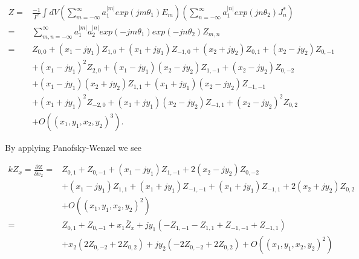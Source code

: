 \documentclass[review, number, sort&compress]{elsarticle}
\begin{document}
\begin{align}
Z = &\frac{-1}{I^{2}} \int dV \left( \displaystyle\sum\limits^{\infty}_{m=-\infty} a_{1}^{|m|} exp \left( jm\theta_{1} \right) E_{m}\right) \left( \displaystyle\sum\limits^{\infty}_{n=-\infty} a_{1}^{|n|} exp \left( jn\theta_{2} \right) J^{*}_{n}\right) \nonumber \\
   = &\displaystyle\sum\limits^{\infty}_{m,n=-\infty} a_{1}^{|m|} a_{2}^{|n|} exp\left( -jm\theta_{1} \right) exp\left( -jn\theta_{2} \right) Z_{m,n} \nonumber \\
   = &Z_{0,0} + \left( x_{1}- jy_{1} \right)Z_{1,0} + \left( x_{1} + jy_{1} \right)Z_{-1,0} + \left( x_{2} + jy_{2} \right)Z_{0,1} +  \left( x_{2} - jy_{2} \right)Z_{0,-1} \nonumber \\
      & +\left( x_{1} - jy_{1} \right)^{2}Z_{2,0} +  \left( x_{1} - jy_{1} \right)\left( x_{2} - jy_{2} \right)Z_{1,-1} + \left( x_{2} - jy_{2} \right) Z_{0,-2} \nonumber \\
      & +\left( x_{1} - jy_{1} \right)\left( x_{2} + jy_{2} \right)Z_{1,1} + \left( x_{1} + jy_{1} \right) \left( x_{2} - jy_{2} \right) Z_{-1,-1} \nonumber \\
      & +\left( x_{1} + jy_{1} \right)^{2}Z_{-2,0} + \left( x_{1} + jy_{1} \right)\left( x_{2} - jy_{2} \right) Z_{-1,1} + \left( x_{2} - jy_{2} \right)^{2}Z_{0,2} \nonumber \\
      & +O\left( \left(  x_{1},y_{1},x_{2},y_{2} \right)^{3} \right).
\label{eqn:gen_imp}
\end{align}

By applying Panofsky-Wenzel we see

\begin{align}
kZ_{x} =\frac{\partial Z}{\partial x_{2}} = & Z_{0,1} + Z_{0,-1} + \left( x_{1} - jy_{1} \right) Z_{1,-1} + 2\left( x_{2} - jy_{2} \right) Z_{0,-2} \nonumber \\
						&+ \left( x_{1} - jy_{1} \right) Z_{1,1} + \left( x_{1} + jy_{1} \right) Z_{-1,-1} + \left( x_{1} + jy_{1} \right) Z_{-1,1} + 2\left( x_{2} + jy_{2} \right) Z_{0,2} \nonumber \\
						& + O\left( \left( x_{1},y_{1},x_{2},y_{2} \right)^{2} \right) \nonumber \\
						= & Z_{0,1} + Z_{0,-1} + x_{1}\bar{Z}_{x} + jy_{1} \left( -Z_{1,-1} - Z_{1,1} + Z_{-1,-1} + Z_{-1,1} \right) \nonumber \\
						& + x_{2}\left( 2Z_{0,-2} + 2Z_{0,2}  \right) + jy_{2}\left( -2Z_{0,-2} + 2Z_{0,2}  \right) +  O\left( \left( x_{1},y_{1},x_{2},y_{2} \right)^{2} \right)
\end{align}
\end{document}
